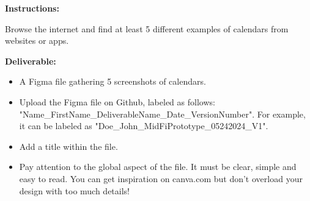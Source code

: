 \makeheaderfiles

\textbf{Instructions:}

Browse the internet and find at least 5 different examples of calendars from websites or apps.

\textbf{Deliverable:}

\begin{itemize}
\item A Figma file gathering 5 screenshots of calendars.
\item Upload the Figma file on Github, labeled as follows: "Name\_FirstName\_DeliverableName\_Date\_VersionNumber". For example, it can be labeled as "Doe\_John\_MidFiPrototype\_05242024\_V1".
\item Add a title within the file.
\item Pay attention to the global aspect of the file. It must be clear, simple and easy to read. You can get inspiration on canva.com but don't overload your design with too much details!
\end{itemize}

